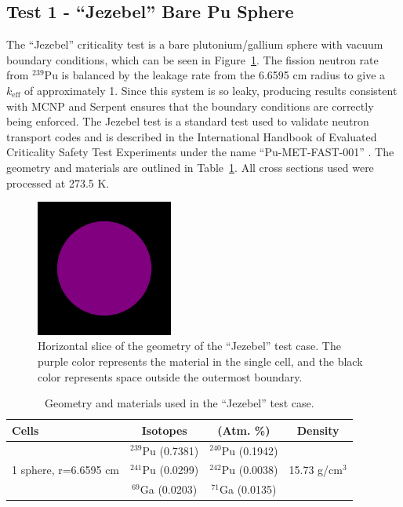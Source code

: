 \documentclass[preprint,12pt]{elsarticle}
\begin{document}
\newpage
\subsection{Test 1 - ``Jezebel'' Bare Pu Sphere}

The ``Jezebel'' criticality test is a bare plutonium/gallium sphere with vacuum boundary conditions, which can be seen in Figure~\ref{jezebel_geom_pic}.  The fission neutron rate from $^{239}$Pu is balanced by the leakage rate from the 6.6595 cm radius to give a $k_\mathrm{eff}$ of approximately 1.  Since this system is so leaky, producing results consistent with MCNP and Serpent ensures that the boundary conditions are correctly being enforced.  The Jezebel test is a standard test used to validate neutron transport codes and is described in the International Handbook of Evaluated Criticality Safety Test Experiments under the name ``Pu-MET-FAST-001'' \cite{bench_handbook}.  The geometry and materials are outlined in Table~\ref{jezebel_geom}.  All cross sections used were processed at 273.5 K.

\begin{figure}[h!] 
  \centering
    \includegraphics[width=0.4\textwidth]{graphics/jezebel-xy.png}
     \caption{ Horizontal slice of the geometry of the ``Jezebel'' test case.  The purple color represents the material in the single cell, and the black color represents space outside the outermost boundary. \label{jezebel_geom_pic} }
\end{figure}

\begin{table}[h]
\centering
\caption{Geometry and materials used in the ``Jezebel'' test case.}
\label{jezebel_geom}
\begin{tabular}{| l | c  c | c |}
\hline
Cells & Isotopes & (Atm. \%)& Density \\
\hline
\multirow{3}{*}{1 sphere, r=6.6595 cm }  &  $^{239}$Pu (0.7381)    &    $^{240}$Pu (0.1942)     &  \multirow{3}{*}{15.73 g/cm$^3$} \\
                                         &  $^{241}$Pu (0.0299)    &     $^{242}$Pu (0.0038)    &   \\
                                         &  $^{69}$Ga  (0.0203)    &     $^{71}$Ga  (0.0135)    &   \\
\hline
\end{tabular}
\end{table}
\end{document}
